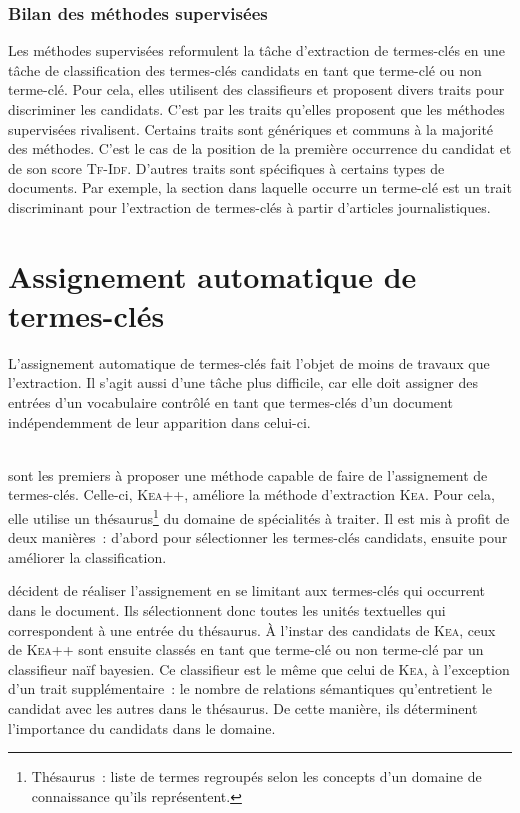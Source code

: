       \subsubsection{Bilan des méthodes supervisées}
      \label{subsubsec:main-state_of_the_art-automatic_keyphrase_extraction-supervised_keyphrase_extraction-conclusion}
        Les méthodes supervisées reformulent la tâche d'extraction de
        termes-clés en une tâche de classification des termes-clés candidats en
        tant que \og{}terme-clé\fg{} ou \og{}non terme-clé\fg{}. Pour cela,
        elles utilisent des classifieurs et proposent divers traits pour
        discriminer les candidats. C'est par les traits qu'elles proposent que
        les méthodes supervisées rivalisent. Certains traits sont génériques et
        communs à la majorité des méthodes. C'est le cas de la position de la
        première occurrence du candidat et de son score \textsc{Tf-Idf}.
        D'autres traits sont spécifiques à certains types de documents. Par
        exemple, la section dans laquelle occurre un terme-clé est un trait
        discriminant pour l'extraction de termes-clés à partir d'articles
        journalistiques.

  \section{Assignement automatique de termes-clés}
  \label{sec:main-state_of_the_art-automatic_keyphrase_assignment}
    L'assignement automatique de termes-clés fait l'objet de moins de travaux
    que l'extraction. Il s'agit aussi d'une tâche plus difficile, car elle doit
    assigner des entrées d'un vocabulaire contrôlé en tant que termes-clés d'un
    document indépendemment de leur apparition dans celui-ci.

    ~\\ sont les premiers à proposer une
    méthode capable de faire de l'assignement de termes-clés. Celle-ci,
    \textsc{Kea}++, améliore la méthode d'extraction \textsc{Kea}. Pour cela,
    elle utilise un thésaurus\footnote{Thésaurus~: liste de termes regroupés
    selon les concepts d'un domaine de connaissance qu'ils représentent.} du
    domaine de spécialités à traiter. Il est mis à profit de deux manières~:
    d'abord pour sélectionner les termes-clés candidats, ensuite pour améliorer
    la classification.

     décident de réaliser l'assignement en se
    limitant aux termes-clés qui occurrent dans le document. Ils sélectionnent
    donc toutes les unités textuelles qui correspondent à une entrée du
    thésaurus. À l'instar des candidats de \textsc{Kea}, ceux de \textsc{Kea++}
    sont ensuite classés en tant que \og{}terme-clé\fg{} ou \og{}non
    terme-clé\fg{} par un classifieur naïf bayesien. Ce classifieur est le même
    que celui de \textsc{Kea}, à l'exception d'un trait supplémentaire~: le
    nombre de relations sémantiques qu'entretient le candidat avec les autres
    dans le thésaurus. De cette manière, ils déterminent l'importance du
    candidats dans le domaine.

